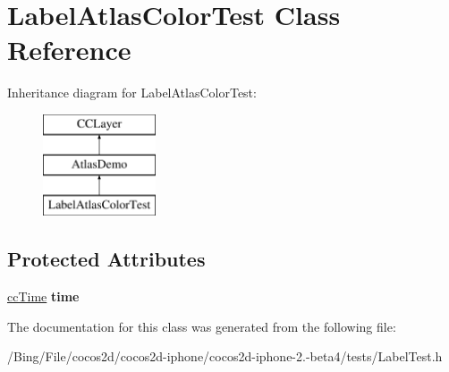 \hypertarget{interface_label_atlas_color_test}{\section{Label\-Atlas\-Color\-Test Class Reference}
\label{interface_label_atlas_color_test}
}
Inheritance diagram for Label\-Atlas\-Color\-Test\-:\begin{figure}[H]
\begin{center}
\leavevmode
\includegraphics[height=3.000000cm]{interface_label_atlas_color_test}
\end{center}
\end{figure}
\subsection*{Protected Attributes}
\begin{DoxyCompactItemize}
\item 
\hypertarget{interface_label_atlas_color_test_a6fb896d7bdb2ba76cfd68fa8b323b54b}{\hyperlink{cc_types_8h_ae6c674aac4bfb46a4e6cb1e89bb66b4f}{cc\-Time} {\bfseries time}}\label{interface_label_atlas_color_test_a6fb896d7bdb2ba76cfd68fa8b323b54b}

\end{DoxyCompactItemize}


The documentation for this class was generated from the following file\-:\begin{DoxyCompactItemize}
\item 
/\-Bing/\-File/cocos2d/cocos2d-\/iphone/cocos2d-\/iphone-\/2.-\/beta4/tests/Label\-Test.\-h\end{DoxyCompactItemize}
